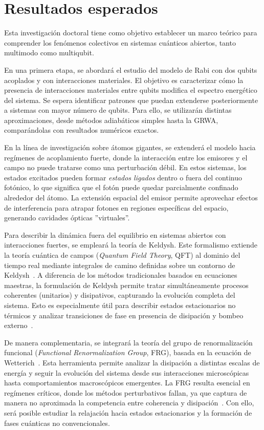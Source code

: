 \documentclass[onecolumn,notitlepage,letterpaper,aps,pra,12pt]{article}
\numberwithin{equation}{section}
\begin{document}
\section{Resultados esperados}

Esta investigación doctoral tiene como objetivo establecer un marco teórico para comprender los fenómenos colectivos en sistemas cuánticos abiertos, tanto multimodo como multiqubit. 

En una primera etapa, se abordará el estudio del modelo de Rabi con dos qubits acoplados y con interacciones materiales. El objetivo es caracterizar cómo la presencia de interacciones materiales entre qubits modifica el espectro energético del sistema. Se espera identificar patrones que puedan extenderse posteriormente a sistemas con mayor número de qubits. Para ello, se utilizarán distintas aproximaciones, desde métodos adiabáticos simples hasta la GRWA, comparándolas con resultados numéricos exactos.

En la línea de investigación sobre átomos gigantes, se extenderá el modelo hacia regímenes de acoplamiento fuerte, donde la interacción entre los emisores y el campo no puede tratarse como una perturbación débil. En estos sistemas, los estados excitados pueden formar \textit{estados ligados} dentro o fuera del continuo fotónico, lo que significa que el fotón puede quedar parcialmente confinado alrededor del átomo. La extensión espacial del emisor permite aprovechar efectos de interferencia para atrapar fotones en regiones específicas del espacio, generando cavidades ópticas ''virtuales''. 

Para describir la dinámica fuera del equilibrio en sistemas abiertos con interacciones fuertes, se empleará la teoría de Keldysh. Este formalismo extiende la teoría cuántica de campos (\textit{Quantum Field Theory}, QFT) al dominio del tiempo real mediante integrales de camino definidas sobre un contorno de Keldysh~\cite{kamenev2023,rammer2011}. A diferencia de los métodos tradicionales basados en ecuaciones maestras, la formulación de Keldysh permite tratar simultáneamente procesos coherentes (unitarios) y disipativos, capturando la evolución completa del sistema. Esto es especialmente útil para describir estados estacionarios no térmicos y analizar transiciones de fase en presencia de disipación y bombeo externo~\cite{Sieberer2016}.

De manera complementaria, se integrará la teoría del grupo de renormalización funcional (\textit{Functional Renormalization Group}, FRG), basada en la ecuación de Wetterich~\cite{wetterich1993}. Esta herramienta permite analizar la disipación a distintas escalas de energía y seguir la evolución del sistema desde sus interacciones microscópicas hasta comportamientos macroscópicos emergentes. La FRG resulta esencial en regímenes críticos, donde los métodos perturbativos fallan, ya que captura de manera no aproximada la competencia entre coherencia y disipación~\cite{angelakis2007}. Con ello, será posible estudiar la relajación hacia estados estacionarios y la formación de fases cuánticas no convencionales.
\end{document}
